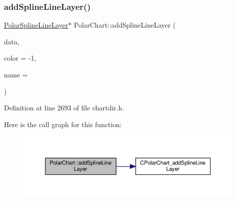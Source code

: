 \subsubsection{\texorpdfstring{add\+Spline\+Line\+Layer()}{addSplineLineLayer()}}
{\footnotesize\ttfamily \hyperlink{class_polar_spline_line_layer}{Polar\+Spline\+Line\+Layer}$\ast$ Polar\+Chart\+::add\+Spline\+Line\+Layer (\begin{DoxyParamCaption}\item[{\hyperlink{class_double_array}{Double\+Array}}]{data,  }\item[{int}]{color = {\ttfamily -\/1},  }\item[{const char $\ast$}]{name = {} }\end{DoxyParamCaption})\hspace{0.3cm}{\ttfamily [inline]}}



Definition at line 2693 of file chartdir.\+h.

Here is the call graph for this function\+:
\nopagebreak
\begin{figure}[H]
\begin{center}
\leavevmode
\includegraphics[width=350pt]{class_polar_chart_a7f51e9599161df80a632fcb512a9c4fc_cgraph}
\end{center}
\end{figure}
\mbox{\label{class_polar_chart_a23fe6742c905e05ba49aaca646aef921}} 
